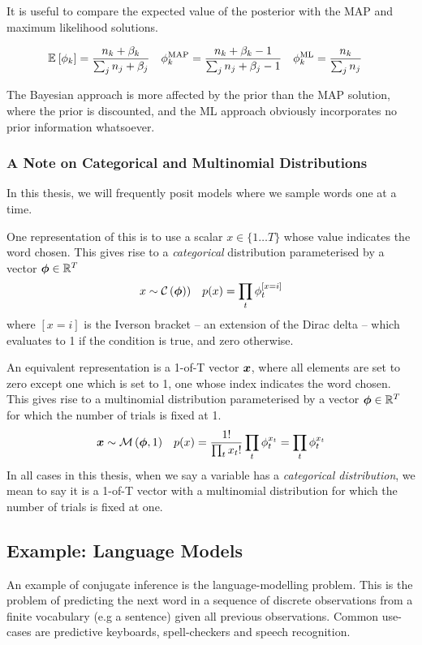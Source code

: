 It is useful to compare the expected value of the posterior with the MAP and maximum likelihood solutions.

\begin{align}
\mathbb{E}_{ {  } }\left[ \phi_k \right]  &= \frac{n_k + \beta_k}{\sum_j n_j + \beta_j} &
\phi_k^{\text{MAP}} &= \frac{n_k + \beta_k - 1}{\sum_j n_j + \beta_j - 1} &
\phi_k^{\text{ML}}  &= \frac{n_k}{\sum_j n_j}
\end{align}

The Bayesian approach is more affected by the prior than the MAP solution, where the prior is discounted, and the ML approach obviously incorporates no prior information whatsoever. 

\subsubsection*{A Note on Categorical and Multinomial Distributions}
In this thesis, we will frequently posit models where we sample words one at a time. 

One representation of this is to use a scalar $x \in \{1 \ldots T\}$ whose value indicates the word chosen. This gives rise to a \emph{categorical} distribution parameterised by a vector $\bm \phi \in { \mathbb{R}^{T} }$
\begin{align}
x &\sim \mathcal{C} \left( {\bm \phi)} \right)&
p(x) = \prod_t \phi_t^{[x = i]}
\end{align}
where $[x = i]$ is the Iverson bracket -- an extension of the Dirac delta -- which evaluates to 1 if the condition is true, and zero otherwise. 

An equivalent representation is a 1-of-T vector $\bm x$, where all elements are set to zero except one which is set to 1, one whose index indicates the word chosen. This gives rise to a multinomial distribution parameterised by a vector $\bm \phi \in { \mathbb{R}^{T} }$ for which the number of trials is fixed at 1.
\begin{align}
\bm x &\sim \mathcal{M} \left( {\bm \phi},{1} \right) &
p(x) = \frac{1!}{\prod_t x_t!}\prod_t \phi_t^{x_t} = \prod_t \phi_t^{x_t}
\end{align}
In all cases in this thesis, when we say a variable has a \emph{categorical distribution}, we mean to say it is a 1-of-T vector with a multinomial distribution for which the number of trials is fixed at one. 

 
\subsection*{Example: Language Models}
 \label{sec:chap1:mackay-lang-model}
An example of conjugate inference is the language-modelling problem. This is the problem of predicting the next word in a sequence of discrete observations from a finite vocabulary (e.g a sentence) given all previous observations. Common use-cases are predictive keyboards, spell-checkers and speech recognition.


